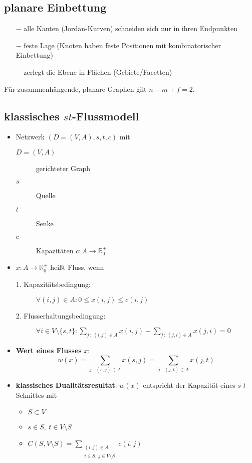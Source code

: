 \subsection{planare Einbettung}
	\begin{itemize}[itemsep=-1pt]
		\item[$-$] alle Kanten (Jordan-Kurven) schneiden sich nur in ihren Endpunkten
		\item[$-$] feste Lage (Knoten haben feste Positionen mit kombinatorischer Einbettung)
		\item[$-$] zerlegt die Ebene in Flächen (Gebiete/Facetten)
	\end{itemize}	
Für zusammenhängende, planare Graphen gilt $n-m+f=2$.

\subsection{klassisches $st$-Flussmodell}
\begin{itemize}[itemsep=-1pt]
	\item Netzwerk $(D=(V,A),s,t,c)$ mit 
		\begin{description}
			\item[$D=(V,A)$] gerichteter Graph
			\item[$s$] Quelle
			\item[$t$] Senke
			\item[$c$] Kapazitäten $c:A\rightarrow \mathbb{R}_0^{+}$
		\end{description}
	\item $x:A\rightarrow\mathbb{R}_0^{+}$ heißt Fluss, wenn
		\begin{description}
			\item[1. Kapazitätsbedingung:] $\forall (i,j)\in A : 0\leq x(i,j)\leq c(i,j)$
			\item[2. Flusserhaltungsbedingung:] $\forall i\in V\setminus\{s,t\} : \sum\limits_{j~:~(i,j)\in A} x(i,j)-\sum\limits_{j~:~(j,i)\in A} x(j,i)=0$
		\end{description}
	\item \textbf{Wert eines Flusses} $x$:
		\[w(x)=\sum\limits_{j~:~(s,j)\in A}x(s,j)=\sum\limits_{j~:~(j,t)\in A}x(j,t)\]
	\item \textbf{klassisches Dualitätsresultat}: $w(x)$ entspricht der Kapazität eines $s$-$t$-Schnittes mit
		\begin{itemize}[itemsep=-1pt]
			\item $S\subset V$
			\item $s\in S,~t\in V\setminus S$
			\item $C(S,V\setminus S)=\sum\limits_{\substack{(i,j)\in A\\i\in S,~j\in V\setminus S}}c(i,j)$
		\end{itemize}
\end{itemize}
